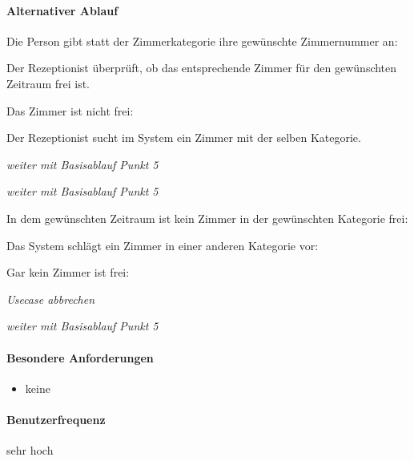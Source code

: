 \paragraph{Alternativer Ablauf}
\begin{longenum}
	\item
	\item
	\item
	\begin{longenum}
			\item Die Person gibt statt der Zimmerkategorie ihre gewünschte \Gls{Zimmernummer} an:
			\begin{longenum}
				\item Der \Gls{Rezeptionist} überprüft, ob das entsprechende \Gls{Zimmer} für den gewünschten Zeitraum frei ist.
				\begin{longenum}
					\item Das \Gls{Zimmer} ist nicht frei:
					\begin{longenum}
						\item Der \Gls{Rezeptionist} sucht im System ein \Gls{Zimmer} mit der selben Kategorie.
						\item \emph{weiter mit Basisablauf Punkt 5}
					\end{longenum}
				\end{longenum}

				\item \emph{weiter mit Basisablauf Punkt 5}
			\end{longenum}
				
	\end{longenum}
	\item
	\begin{longenum}
		\item In dem gewünschten Zeitraum ist kein \Gls{Zimmer} in der gewünschten
		Kategorie frei:
		\begin{longenum}
			\item Das System schlägt ein \Gls{Zimmer} in einer anderen Kategorie vor:
			\begin{longenum}
				\item Gar kein \Gls{Zimmer} ist frei:
				\begin{longenum}
					\item \emph{Usecase abbrechen}
				\end{longenum}
			\end{longenum}
			\item \emph{weiter mit Basisablauf Punkt 5}
		\end{longenum}
	\end{longenum}
	\item
	\item
	\item
	\item
\end{longenum}

\paragraph{Besondere Anforderungen}
\begin{itemize}
	\item keine
\end{itemize}

\paragraph{Benutzerfrequenz}
sehr hoch

\newpage
